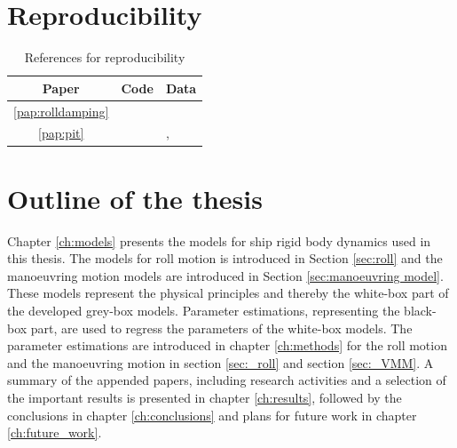 \section{Reproducibility}
\begin{table}[H]
    \centering
    \caption{References for reproducibility}
    \label{tab:reproducibility}
    \begin{tabular}{|c|l|l|}
        \hline
         Paper &  Code & Data \\
         \hline
         \ref{pap:rolldamping} & \textcite{alexandersson_martinlarsalbertrolldecay-estimators_2020} & ~ \\
         \ref{pap:pit} & \textcite{alexandersson_code_2022} & \textcite{alexandersson_wpcc_2022}, \textcite{stern_experience_2011} \\
         \hline
    \end{tabular}
\end{table}

\section{Outline of the thesis}
Chapter \ref{ch:models} presents the models for ship rigid body dynamics used in this thesis. The models for roll motion is introduced in Section \ref{sec:roll} and the manoeuvring motion models are introduced in Section \ref{sec:manoeuvring model}. These models represent the physical principles and thereby the white-box part of the developed grey-box models.
Parameter estimations, representing the black-box part, are used to regress the parameters of the white-box models. The parameter estimations are introduced in chapter \ref{ch:methods} for the roll motion and the manoeuvring motion in section \ref{sec:_roll} and section \ref{sec:_VMM}. 
A summary of the appended papers, including research activities and a selection of the important results is presented in chapter \ref{ch:results}, followed by the conclusions in chapter \ref{ch:conclusions} and plans for future work in chapter \ref{ch:future_work}.